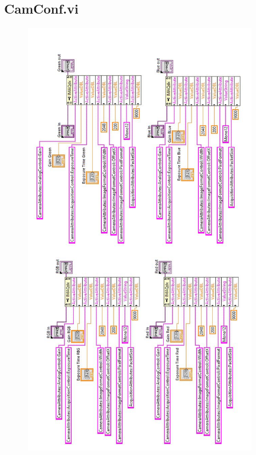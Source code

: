 \subsection{CamConf.vi}
\begin{figure}[h]
\begin{center}
\includegraphics[width=10cm]{Pictures/AppCamConfvi}
\end{center}
\end{figure}

\newpage
